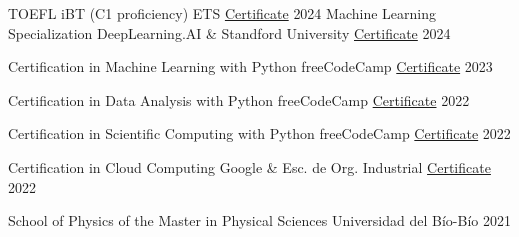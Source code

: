

\begin{cvhonors}

  \cvhonor
    {TOEFL iBT (C1 proficiency)} %
    {ETS} %
    {\href{https://joacoh.github.io/files/toefl.pdf}{Certificate}} %
    {2024} %
  \cvhonor
    {Machine Learning Specialization} %
    {DeepLearning.AI \& Standford University} %
    {\href{https://www.coursera.org/account/accomplishments/specialization/9ZUV9TSH2GB6}{Certificate}} %
    {2024} %

  \cvhonor
    {Certification in Machine Learning with Python} %
    {freeCodeCamp} %
    {\href{https://www.freecodecamp.org/certification/_joacoh/machine-learning-with-python-v7}{Certificate}} %
    {2023} %

  \cvhonor
    {Certification in Data Analysis with Python} %
    {freeCodeCamp} %
    {\href{https://freecodecamp.org/certification/_joacoh/data-analysis-with-python-v7}{Certificate}} %
    {2022} %

  \cvhonor
    {Certification in Scientific Computing with Python} %
    {freeCodeCamp} %
    {\href{https://freecodecamp.org/certification/_joacoh/scientific-computing-with-python-v7}{Certificate}} %
    {2022} %

  \cvhonor
    {Certification in Cloud Computing} %
    {Google \& Esc. de Org. Industrial} %
    {\href{https://joacoh.github.io/files/cloud_certificate.pdf}{Certificate}} %
    {2022} %

  \cvhonor
    {School of Physics of the Master in Physical Sciences} %
    {Universidad del Bío-Bío} %
    {} %
    {2021} %

\end{cvhonors}
